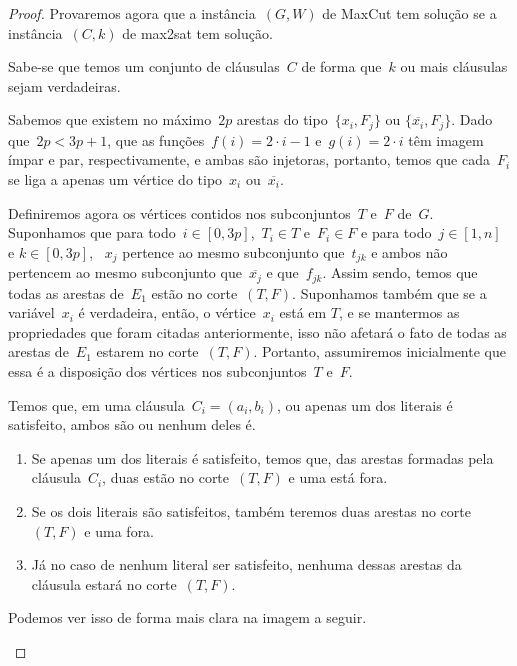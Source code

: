 		\begin{proof}
		Provaremos agora que a instância~$(G,W)$ de MaxCut tem solução se
		a instância~$(C,k)$ de {\sc max2sat} tem solução.
		
		Sabe-se que temos um conjunto de cláusulas~$C$
		de forma que~$k$ ou mais
		cláusulas sejam verdadeiras.

		Sabemos que existem no máximo~$2p$ arestas do 
		tipo~${\{x_i,F_j\}}$ ou ${\{\overline{x_i},F_j\}}$. Dado 
		que~${2p<3p+1}$,
		que as funções~${f(i)=2\cdot i - 1}$ e~${g(i)=2\cdot i}$ têm 
		imagem ímpar e par, respectivamente, e ambas são injetoras, 
		portanto, temos que cada~$F_i$ se liga a apenas um vértice
		do tipo~$x_i$ ou~${\overline{x_i}}$.

		Definiremos agora os vértices contidos nos 
		subconjuntos~$T$ e~$F$ de~$G$.
		Suponhamos que para todo~${i\in[0,3p]}$,~${T_i\in T}$ 
		e~${F_i\in F}$ e
		para todo~${j\in[1,n]}$ e ${k\in[0,3p]}$, ~$x_j$ pertence ao 
		mesmo subconjunto que~$t_{jk}$ e ambos não pertencem ao mesmo 
		subconjunto que~$\overline{x_j}$ e que~$f_{jk}$.
		Assim sendo, temos que todas as arestas de~$E_1$ estão no 
		corte~$(T,F)$.
		Suponhamos também que se a variável~$x_i$ é verdadeira,
		então, o vértice~$x_i$ está em $T$, e se mantermos as 
		propriedades que foram citadas anteriormente, isso não afetará o 
		fato de todas as arestas de~$E_1$ estarem no corte~$(T,F)$.
		Portanto, assumiremos inicialmente que essa é a disposição dos 
		vértices nos subconjuntos~$T$ e~$F$.

		Temos que, em uma cláusula~${C_i=(a_i,b_i)}$, ou
		apenas um dos literais é satisfeito, ambos são ou nenhum
		deles é.
		\begin{enumerate}
			\item Se apenas um dos literais é satisfeito, temos que,
			das arestas formadas pela cláusula~$C_i$, duas
			estão no corte~$(T,F)$ e uma está fora.
			\item Se os dois literais são satisfeitos, também teremos
			duas arestas no corte~$(T,F)$ e uma fora.
			\item Já no caso de nenhum literal ser satisfeito, nenhuma
			dessas arestas da cláusula estará no corte~$(T,F)$.
		\end{enumerate}

		Podemos ver isso de forma mais clara na imagem a seguir.

		\begin{center} \begin{tikzpicture}
			[scale=.24,auto=left,every node/.style={circle, 
			draw=black,
			fill=blue!20}]
			



\end{tikzpicture}
\end{center}
\end{proof}
